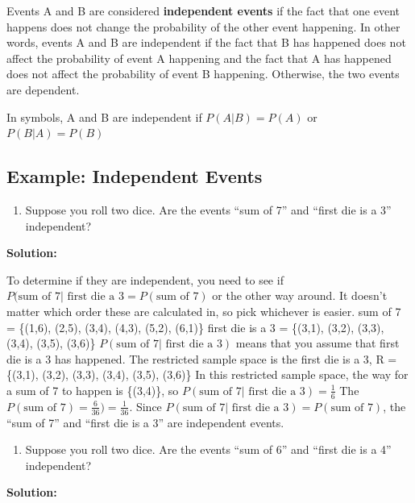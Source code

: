 \documentclass[]{book}
\providecommand{\tightlist}{%
  \setlength{\itemsep}{0pt}\setlength{\parskip}{0pt}}
\begin{document}
Events A and B are considered \textbf{independent events} if the fact that one event happens does not change the probability of the other event happening. In other words, events A and B are independent if the fact that B has happened does not affect the probability of event A happening and the fact that A has happened does not affect the probability of event B happening. Otherwise, the two events are dependent.

In symbols, A and B are independent if \(P(A|B)=P(A)\) or \(P(B|A)=P(B)\)

\hypertarget{example-independent-events}{%
\subsection{Example: Independent Events}\label{example-independent-events}}

\begin{enumerate}
\def\labelenumi{\alph{enumi}.}
\tightlist
\item
  Suppose you roll two dice. Are the events ``sum of 7'' and ``first die is a 3'' independent?
\end{enumerate}

\textbf{Solution:}

To determine if they are independent, you need to see if \(P(\text{sum of 7| first die a 3}=P(\text{sum of 7})\) or the other way around. It doesn't matter which order these are calculated in, so pick whichever is easier.
sum of 7 = \{(1,6), (2,5), (3,4), (4,3), (5,2), (6,1)\}
first die is a 3 = \{(3,1), (3,2), (3,3), (3,4), (3,5), (3,6)\}
\(P(\text{sum of 7| first die a 3})\) means that you assume that first die is a 3 has happened. The restricted sample space is the first die is a 3, R = \{(3,1), (3,2), (3,3), (3,4), (3,5), (3,6)\}
In this restricted sample space, the way for a sum of 7 to happen is \{(3,4)\},
so \(P(\text{sum of 7| first die a 3})=\frac{1}{6}\)
The \(P(\text{sum of 7})=\frac{6}{36})=\frac{1}{36}\).
Since \(P(\text{sum of 7| first die a 3})=P(\text{sum of 7})\), the ``sum of 7'' and ``first die is a 3'' are independent events.

\begin{enumerate}
\def\labelenumi{\alph{enumi}.}
\setcounter{enumi}{1}
\tightlist
\item
  Suppose you roll two dice. Are the events ``sum of 6'' and ``first die is a 4'' independent?
\end{enumerate}

\textbf{Solution:}
\end{document}
